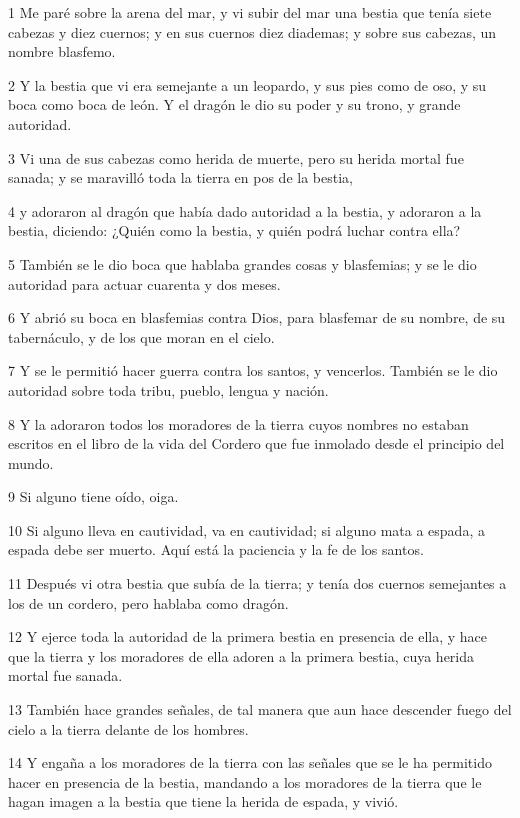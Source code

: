 \par 1 Me paré sobre la arena del mar, y vi subir del mar una bestia que tenía siete cabezas y diez cuernos; y en sus cuernos diez diademas; y sobre sus cabezas, un nombre blasfemo.
\par 2 Y la bestia que vi era semejante a un leopardo, y sus pies como de oso, y su boca como boca de león. Y el dragón le dio su poder y su trono, y grande autoridad.
\par 3 Vi una de sus cabezas como herida de muerte, pero su herida mortal fue sanada; y se maravilló toda la tierra en pos de la bestia,
\par 4 y adoraron al dragón que había dado autoridad a la bestia, y adoraron a la bestia, diciendo: ¿Quién como la bestia, y quién podrá luchar contra ella?
\par 5 También se le dio boca que hablaba grandes cosas y blasfemias; y se le dio autoridad para actuar cuarenta y dos meses.
\par 6 Y abrió su boca en blasfemias contra Dios, para blasfemar de su nombre, de su tabernáculo, y de los que moran en el cielo.
\par 7 Y se le permitió hacer guerra contra los santos, y vencerlos. También se le dio autoridad sobre toda tribu, pueblo, lengua y nación.
\par 8 Y la adoraron todos los moradores de la tierra cuyos nombres no estaban escritos en el libro de la vida del Cordero que fue inmolado desde el principio del mundo.
\par 9 Si alguno tiene oído, oiga.
\par 10 Si alguno lleva en cautividad, va en cautividad; si alguno mata a espada, a espada debe ser muerto. Aquí está la paciencia y la fe de los santos.
\par 11 Después vi otra bestia que subía de la tierra; y tenía dos cuernos semejantes a los de un cordero, pero hablaba como dragón.
\par 12 Y ejerce toda la autoridad de la primera bestia en presencia de ella, y hace que la tierra y los moradores de ella adoren a la primera bestia, cuya herida mortal fue sanada.
\par 13 También hace grandes señales, de tal manera que aun hace descender fuego del cielo a la tierra delante de los hombres.
\par 14 Y engaña a los moradores de la tierra con las señales que se le ha permitido hacer en presencia de la bestia, mandando a los moradores de la tierra que le hagan imagen a la bestia que tiene la herida de espada, y vivió.
